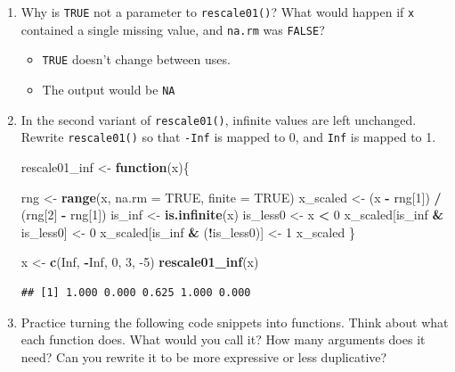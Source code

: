 \documentclass[]{book}
\newenvironment{Shaded}{\begin{snugshade}}{\end{snugshade}}
\newcommand{\ControlFlowTok}[1]{\textcolor[rgb]{0.13,0.29,0.53}{\textbf{#1}}}
\newcommand{\DataTypeTok}[1]{\textcolor[rgb]{0.13,0.29,0.53}{#1}}
\newcommand{\DecValTok}[1]{\textcolor[rgb]{0.00,0.00,0.81}{#1}}
\newcommand{\KeywordTok}[1]{\textcolor[rgb]{0.13,0.29,0.53}{\textbf{#1}}}
\newcommand{\NormalTok}[1]{#1}
\newcommand{\OperatorTok}[1]{\textcolor[rgb]{0.81,0.36,0.00}{\textbf{#1}}}
\newcommand{\OtherTok}[1]{\textcolor[rgb]{0.56,0.35,0.01}{#1}}
\newcommand{\StringTok}[1]{\textcolor[rgb]{0.31,0.60,0.02}{#1}}
\providecommand{\tightlist}{%
  \setlength{\itemsep}{0pt}\setlength{\parskip}{0pt}}
\theoremstyle{definition}
\theoremstyle{definition}
\theoremstyle{definition}
\theoremstyle{remark}
\begin{document}
\begin{enumerate}
\def\labelenumi{\arabic{enumi}.}
\item
  Why is \texttt{TRUE} not a parameter to \texttt{rescale01()}? What
  would happen if \texttt{x} contained a single missing value, and
  \texttt{na.rm} was \texttt{FALSE}?

  \begin{itemize}
  \tightlist
  \item
    \texttt{TRUE} doesn't change between uses.
  \item
    The output would be \texttt{NA}
  \end{itemize}
\item
  In the second variant of \texttt{rescale01()}, infinite values are
  left unchanged. Rewrite \texttt{rescale01()} so that \texttt{-Inf} is
  mapped to 0, and \texttt{Inf} is mapped to 1.

\begin{Shaded}
\begin{Highlighting}[]
\NormalTok{rescale01_inf <-}\StringTok{ }\ControlFlowTok{function}\NormalTok{(x)\{}

\NormalTok{  rng <-}\StringTok{ }\KeywordTok{range}\NormalTok{(x, }\DataTypeTok{na.rm =} \OtherTok{TRUE}\NormalTok{, }\DataTypeTok{finite =} \OtherTok{TRUE}\NormalTok{)}
\NormalTok{  x_scaled <-}\StringTok{ }\NormalTok{(x }\OperatorTok{-}\StringTok{ }\NormalTok{rng[}\DecValTok{1}\NormalTok{]) }\OperatorTok{/}\StringTok{ }\NormalTok{(rng[}\DecValTok{2}\NormalTok{] }\OperatorTok{-}\StringTok{ }\NormalTok{rng[}\DecValTok{1}\NormalTok{])}
\NormalTok{  is_inf <-}\StringTok{ }\KeywordTok{is.infinite}\NormalTok{(x)}
\NormalTok{  is_less0 <-}\StringTok{ }\NormalTok{x }\OperatorTok{<}\StringTok{ }\DecValTok{0}
\NormalTok{  x_scaled[is_inf }\OperatorTok{&}\StringTok{ }\NormalTok{is_less0] <-}\StringTok{ }\DecValTok{0}
\NormalTok{  x_scaled[is_inf }\OperatorTok{&}\StringTok{ }\NormalTok{(}\OperatorTok{!}\NormalTok{is_less0)] <-}\StringTok{ }\DecValTok{1}
\NormalTok{  x_scaled}
\NormalTok{\}}

\NormalTok{x <-}\StringTok{  }\KeywordTok{c}\NormalTok{(}\OtherTok{Inf}\NormalTok{, }\OperatorTok{-}\OtherTok{Inf}\NormalTok{, }\DecValTok{0}\NormalTok{, }\DecValTok{3}\NormalTok{, }\DecValTok{-5}\NormalTok{)}
\KeywordTok{rescale01_inf}\NormalTok{(x)}
\end{Highlighting}
\end{Shaded}

\begin{verbatim}
## [1] 1.000 0.000 0.625 1.000 0.000
\end{verbatim}
\item
  Practice turning the following code snippets into functions. Think
  about what each function does. What would you call it? How many
  arguments does it need? Can you rewrite it to be more expressive or
  less duplicative?


\end{enumerate}
\end{document}
